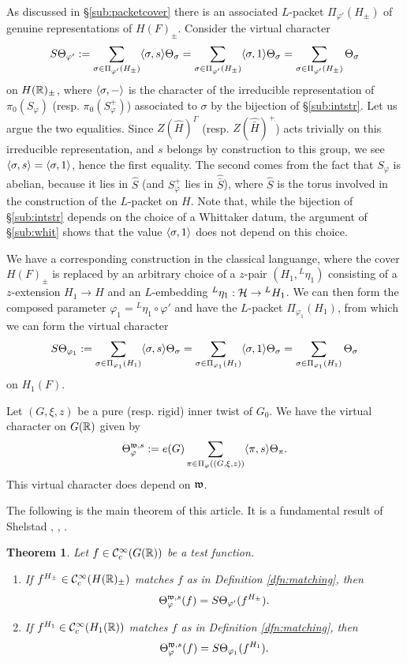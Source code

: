 \documentclass{article}
\newtheorem{thm}{Theorem}[subsection]
\theoremstyle{definition}
\numberwithin{equation}{section}
\renewcommand{\-}{\hyp{}}
\begin{document}
As discussed in \S\ref{sub:packetcover} there is an associated $L$\-packet $\Pi_{\varphi'}(H_\pm)$ of genuine representations of $H(F)_\pm$. Consider the virtual character
\[ S\Theta_{\varphi'} := \sum_{\sigma \in \Pi_{\varphi'}(H_\pm)} \langle\sigma,s\rangle\Theta_\sigma = \sum_{\sigma \in \Pi_{\varphi'}(H_\pm)} \langle\sigma,1\rangle\Theta_\sigma = \sum_{\sigma \in \Pi_{\varphi'}(H_\pm)} \Theta_\sigma\]
on $H(\mathbb{R})_\pm$, where $\langle\sigma,-\rangle$ is the character of the irreducible representation of $\pi_0(S_\varphi)$ (resp. $\pi_0(S_\varphi^+)$) associated to $\sigma$ by the bijection of \S\ref{sub:intstr}. Let us argue the two equalities. Since $Z(\hat H)^\Gamma$ (resp. $Z(\hat{\bar H})^+$) acts trivially on this irreducible representation, and $s$ belongs by construction to this group, we see $\langle\sigma,s\rangle=\langle\sigma,1\rangle$, hence the first equality. The second comes from the fact that $S_\varphi$ is abelian, because it lies in $\hat S$ (and $S_\varphi^+$ lies in $\hat{\bar S}$), where $\hat S$ is the torus involved in the construction of the $L$\-packet on $H$. Note that, while the bijection of \S\ref{sub:intstr} depends on the choice of a Whittaker datum, the argument of \S\ref{sub:whit} shows that the value $\langle\sigma,1\rangle$ does not depend on this choice.

We have a corresponding construction in the classical languange, where the cover $H(F)_\pm$ is replaced by an arbitrary choice of a $z$-pair $(H_1,{^L\eta_1})$ consisting of a $z$-extension $H_1 \to H$ and an $L$-embedding $^L\eta_1 : \mathcal{H} \to {^LH_1}$. We can then form the composed parameter $\varphi_1 = {^L\eta_1} \circ \varphi'$ and have the $L$-packet $\Pi_{\varphi_1}(H_1)$, from which we can form the virtual character
\[ S\Theta_{\varphi_1} := \sum_{\sigma \in \Pi_{\varphi_1}(H_1)} \langle\sigma,s\rangle\Theta_\sigma = \sum_{\sigma \in \Pi_{\varphi_1}(H_1)} \langle\sigma,1\rangle\Theta_\sigma = \sum_{\sigma \in \Pi_{\varphi_1}(H_1)} \Theta_\sigma\]
on $H_1(F)$.

Let $(G,\xi,z)$ be a pure (resp. rigid) inner twist of $G_0$. We have the virtual character on $G(\mathbb{R})$ given by
\[ \Theta_{\varphi}^{\mathfrak{w},s} := e(G)\sum_{\pi \in \Pi_\varphi((G,\xi,z))} \langle\pi,s\rangle\Theta_\pi. \]
This virtual character does depend on $\mathfrak{w}$.

The following is the main theorem of this article. It is a fundamental result of Shelstad \cite{She82}, \cite{SheTE2}, \cite{SheTE3}.
\begin{thm} \label{thm:main1}
Let $f \in \mathcal{C}^\infty_c(G(\mathbb{R}))$ be a test function.
\begin{enumerate}
	\item If $f^{H_\pm} \in \mathcal{C}^\infty_c(H(\mathbb{R})_\pm)$ matches $f$ as in Definition \ref{dfn:matching}, then
	\[ \Theta_\varphi^{\mathfrak{w},s}(f) = S\Theta_{\varphi'}(f^{H_\pm}). \]
	\item If $f^{H_1} \in \mathcal{C}^\infty_c(H_1(\mathbb{R}))$ matches $f$ as in Definition \ref{dfn:matching}, then
	\[ \Theta_\varphi^{\mathfrak{w},s}(f) = S\Theta_{\varphi_1}(f^{H_1}). \]
\end{enumerate}
\end{thm}
\end{document}
